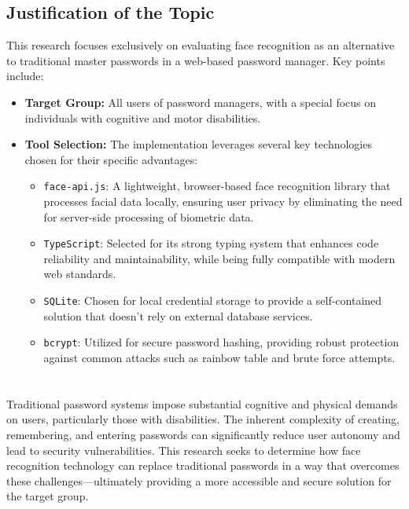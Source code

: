 \subsection{Justification of the Topic}
This research focuses exclusively on evaluating face recognition as an alternative to traditional master passwords in a web-based password manager. Key points include:
\begin{itemize}
  \item \textbf{Target Group:} All users of password managers, with a special focus on individuals with cognitive and motor disabilities.
  \item \textbf{Tool Selection:} The implementation leverages several key technologies chosen for their specific advantages:
  \begin{itemize}
    \item \texttt{face-api.js}: A lightweight, browser-based face recognition library that processes facial data locally, ensuring user privacy by eliminating the need for server-side processing of biometric data.
    \item \texttt{TypeScript}: Selected for its strong typing system that enhances code reliability and maintainability, while being fully compatible with modern web standards.
    \item \texttt{SQLite}: Chosen for local credential storage to provide a self-contained solution that doesn't rely on external database services.
    \item \texttt{bcrypt}: Utilized for secure password hashing, providing robust protection against common attacks such as rainbow table and brute force attempts.
  \end{itemize}
\end{itemize}

\section{}%
\label{sec:probleemstelling}

Traditional password systems impose substantial cognitive and physical demands on users, particularly those with disabilities. The inherent complexity of creating, remembering, and entering passwords can significantly reduce user autonomy and lead to security vulnerabilities. This research seeks to determine how face recognition technology can replace traditional passwords in a way that overcomes these challenges—ultimately providing a more accessible and secure solution for the target group.

